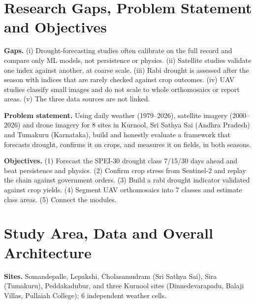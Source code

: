 \documentclass[11pt,a4paper,oneside]{article}
\begin{document}
\section{Research Gaps, Problem Statement and Objectives}
\textbf{Gaps.} (i) Drought-forecasting studies often calibrate on the full record and compare only ML models, not persistence or physics. (ii) Satellite studies validate one index against another, at coarse scale. (iii) Rabi drought is assessed after the season with indices that are rarely checked against crop outcomes. (iv) UAV studies classify small images and do not scale to whole orthomosaics or report areas. (v) The three data sources are not linked.

\textbf{Problem statement.} Using daily weather (1979--2026), satellite imagery (2000--2026) and drone imagery for 8 sites in Kurnool, Sri Sathya Sai (Andhra Pradesh) and Tumakuru (Karnataka), build and honestly evaluate a framework that forecasts drought, confirms it on crops, and measures it on fields, in both seasons.

\textbf{Objectives.} (1) Forecast the SPEI-30 drought class 7/15/30 days ahead and beat persistence and physics. (2) Confirm crop stress from Sentinel-2 and replay the chain against government orders. (3) Build a rabi drought indicator validated against crop yields. (4) Segment UAV orthomosaics into 7 classes and estimate class areas. (5) Connect the modules.

\section{Study Area, Data and Overall Architecture}
\textbf{Sites.} Somandepalle, Lepakshi, Cholasamudram (Sri Sathya Sai), Sira (Tumakuru), Peddakadubur, and three Kurnool sites (Dinnedevarapadu, Balaji Villas, Pullaiah College); 6 independent weather cells.
\end{document}
